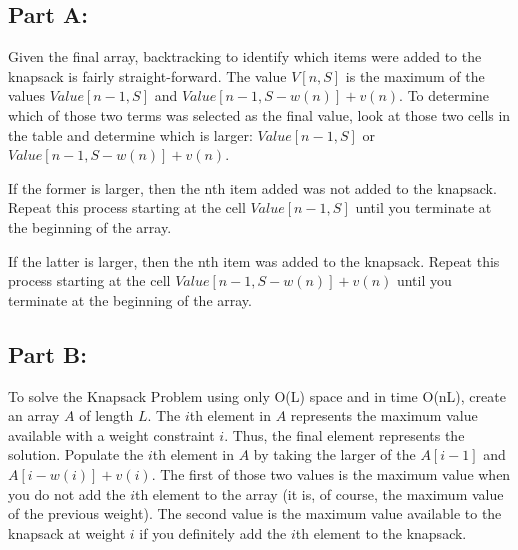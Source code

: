 \documentclass[12pt]{article}
\begin{document}
\subsection{Part A:}

Given the final array, backtracking to identify which items were added to the knapsack is fairly straight-forward. The value $V[n, S]$ is the maximum of the values $Value[n-1, S]$ and $Value[n-1, S-w(n)] + v(n)$. To determine which of those two terms was selected as the final value, look at those two cells in the table and determine which is larger: $Value[n-1, S]$ or $Value[n-1, S-w(n)] + v(n)$. 

If the former is larger, then the nth item added was not added to the knapsack. Repeat this process starting at the cell $Value[n-1, S]$ until you terminate at the beginning of the array. 

If the latter is larger, then the nth item was added to the knapsack. Repeat this process starting at the cell $Value[n-1, S-w(n)] + v(n)$ until you terminate at the beginning of the array.

\subsection{Part B:}

To solve the Knapsack Problem using only O(L) space and in time O(nL), create an array $A$ of length $L$. The $i$th element in $A$ represents the maximum value available with a weight constraint $i$. Thus, the final element represents the solution. Populate the $i$th element in $A$ by taking the larger of the $A[i-1]$ and $A[i-w(i)] + v(i)$. The first of those two values is the maximum value when you do not add the $i$th element to the array (it is, of course, the maximum value of the previous weight). The second value is the maximum value available to the knapsack at weight $i$ if you definitely add the $i$th element to the knapsack.
\end{document}
